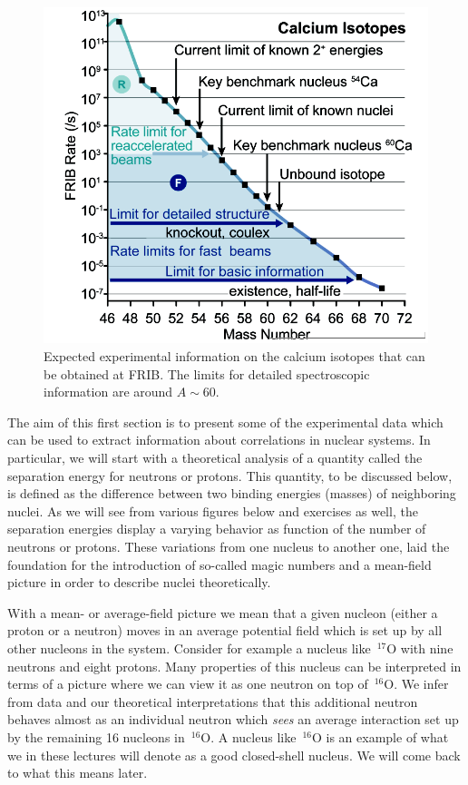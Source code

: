 \documentclass[%
oneside,                 %
final,                   %
10pt]{article}
\begin{document}
\begin{figure}[t]
  \centerline{\includegraphics[width=0.6\linewidth]{fig-intro/careach.png}}
  \caption{
  Expected experimental information on the calcium isotopes that can be obtained at FRIB. The limits for detailed spectroscopic information are around $A\sim 60$.
  }
\end{figure}



The aim of this first section is to present some of the experimental data which can be used to extract 
information about correlations in nuclear systems. In particular, we will start with a theoretical analysis of a quantity called the separation energy for neutrons or protons. This quantity, to be discussed below, is defined as the difference between two binding energies (masses) of neighboring nuclei. As we will see from various figures below and exercises as well, the separation energies display a varying behavior as function of the number of neutrons or protons. These variations from one nucleus to another one, laid the foundation for the introduction of so-called magic numbers and a mean-field picture in order to describe nuclei theoretically.



With a mean- or average-field picture we mean that a given nucleon (either a proton or a neutron) moves in an average potential field which is set up by all other nucleons in the system. Consider for example a nucleus like $\,{}^{17}\mbox{O}$ with nine neutrons and eight protons. Many properties  of this nucleus can be interpreted in terms of a picture where we can view it as
one neutron on top of $\,{}^{16}\mbox{O}$. We infer from data and our theoretical interpretations that this additional neutron behaves almost as an individual neutron which \emph{sees} an average interaction set up by the remaining 16 nucleons in   $\,{}^{16}\mbox{O}$. A nucleus like $\,{}^{16}\mbox{O}$ is an example of what we in these lectures will denote as a good closed-shell nucleus. We will come back to what this means later.
\end{document}
